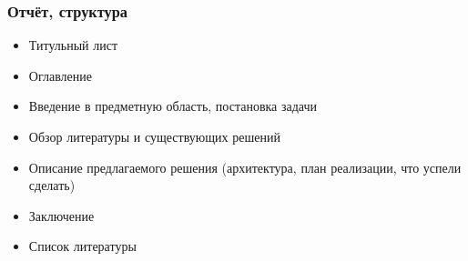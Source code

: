 \documentclass[xetex,mathserif,serif]{beamer}
\begin{document}
    \begin{frame}
        \frametitle{Отчёт, структура}
        \begin{itemize}
            \item Титульный лист
            \item Оглавление
            \item Введение в предметную область, постановка задачи
            \item Обзор литературы и существующих решений
            \item Описание предлагаемого решения (архитектура, план реализации, что успели сделать)
            \item Заключение
            \item Список литературы
        \end{itemize}
    \end{frame}
\end{document}

